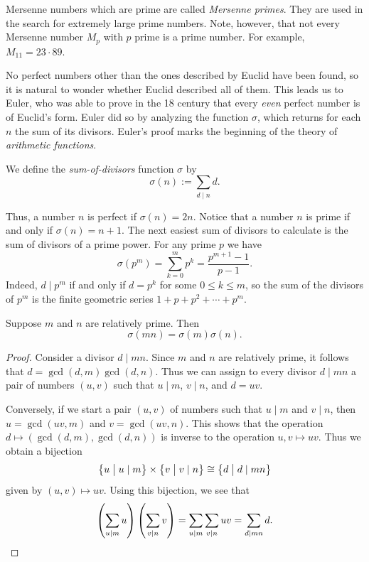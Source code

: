 Mersenne numbers which are prime are called \emph{Mersenne primes}. They are used in the search for extremely large prime numbers. Note, however, that not every Mersenne number $M_p$ with $p$ prime is a prime number. For example, $M_{11}=23\cdot 89$.

No perfect numbers other than the ones described by Euclid have been found, so it is natural to wonder whether Euclid described all of them. This leads us to Euler, who was able to prove in the 18\supth{} century that every \emph{even} perfect number is of Euclid's form. Euler did so by analyzing the function $\sigma$, which returns for each $n$ the sum of its divisors. Euler's proof marks the beginning of the theory of \emph{arithmetic functions}. 

\begin{definition}
  We define the \emph{sum-of-divisors} function $\sigma$ by
  \begin{equation*}
    \sigma(n):=\sum_{d\mid n}d.
  \end{equation*}
\end{definition}

Thus, a number $n$ is perfect if $\sigma(n)=2n$. Notice that a number $n$ is prime if and only if $\sigma(n)=n+1$. The next easiest sum of divisors to calculate is the sum of divisors of a prime power. For any prime $p$ we have
\begin{equation*}
  \sigma(p^m)=\sum_{k=0}^m p^k=\frac{p^{m+1}-1}{p-1}.
\end{equation*}
Indeed, $d\mid p^m$ if and only if $d=p^k$ for some $0\leq k\leq m$, so the sum of the divisors of $p^m$ is the finite geometric series $1+p+p^2+\cdots + p^m$.

\begin{proposition}
  Suppose $m$ and $n$ are relatively prime. Then
  \begin{equation*}
    \sigma(mn)=\sigma(m)\sigma(n).
  \end{equation*}
\end{proposition}

\begin{proof}
  Consider a divisor $d\mid mn$. Since $m$ and $n$ are relatively prime, it follows that $d=\gcd(d,m)\gcd(d,n)$. Thus we can assign to every divisor $d\mid mn$ a pair of numbers $(u,v)$ such that $u\mid m$, $v\mid n$, and $d=uv$.

  Conversely, if we start a pair $(u,v)$ of numbers such that $u\mid m$ and $v\mid n$, then $u=\gcd(uv,m)$ and $v=\gcd(uv,n)$. This shows that the operation $d\mapsto (\gcd(d,m),\gcd(d,n))$ is inverse to the operation $u,v\mapsto uv$. Thus we obtain a bijection
  \begin{equation*}
    \big\{u\bigm\vert u\mid m\big\}\times\big\{v\bigm\vert v\mid n\big\}\cong
    \big\{d \bigm\vert d\mid mn\big\}
  \end{equation*}
  given by $(u,v)\mapsto uv$. Using this bijection, we see that
  \begin{equation*}
    \left(\sum_{u\mid m}u\right)\left(\sum_{v\mid n}v\right)=\sum_{u\mid m}\sum_{v\mid n} uv = \sum_{d\mid mn} d.\qedhere
  \end{equation*}
\end{proof}

